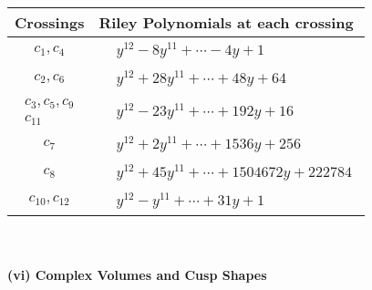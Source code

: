 \documentclass[1p]{elsarticle_modified}
\theoremstyle{definition}
\begin{document}
\begin{tabular}{m{50pt}|m{274pt}}
Crossings & \hspace{64pt}Riley Polynomials at each crossing \\
\hline $$\begin{aligned}c_{1},c_{4}\end{aligned}$$&$\begin{aligned}
&y^{12}-8 y^{11}+\cdots-4 y+1
\end{aligned}$\\
\hline $$\begin{aligned}c_{2},c_{6}\end{aligned}$$&$\begin{aligned}
&y^{12}+28 y^{11}+\cdots+48 y+64
\end{aligned}$\\
\hline $$\begin{aligned}c_{3},c_{5},c_{9}\\c_{11}\end{aligned}$$&$\begin{aligned}
&y^{12}-23 y^{11}+\cdots+192 y+16
\end{aligned}$\\
\hline $$\begin{aligned}c_{7}\end{aligned}$$&$\begin{aligned}
&y^{12}+2 y^{11}+\cdots+1536 y+256
\end{aligned}$\\
\hline $$\begin{aligned}c_{8}\end{aligned}$$&$\begin{aligned}
&y^{12}+45 y^{11}+\cdots+1504672 y+222784
\end{aligned}$\\
\hline $$\begin{aligned}c_{10},c_{12}\end{aligned}$$&$\begin{aligned}
&y^{12}- y^{11}+\cdots+31 y+1
\end{aligned}$\\
\hline
\end{tabular}\\~\\
\newpage\flushleft \textbf{(vi) Complex Volumes and Cusp Shapes}
\end{document}

